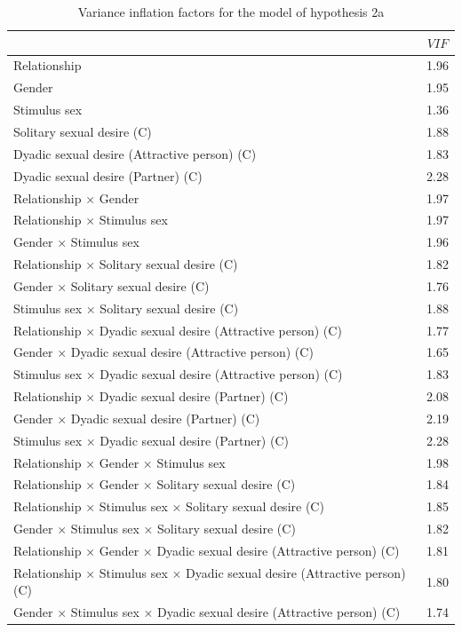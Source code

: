 \documentclass[
  bookmarksnumbered]{article}
\begin{document}
\begin{table}[H]

\caption{\label{tab:coli-m2b}Variance inflation factors for the model of hypothesis 2a}
\centering
\begin{tabular}[t]{lc}
\toprule
  & $VIF$\\
\midrule
Relationship & 1.96\\
Gender & 1.95\\
Stimulus sex & 1.36\\
Solitary sexual desire (C) & 1.88\\
Dyadic sexual desire (Attractive person) (C) & 1.83\\
Dyadic sexual desire (Partner) (C) & 2.28\\
Relationship × Gender & 1.97\\
Relationship × Stimulus sex & 1.97\\
Gender × Stimulus sex & 1.96\\
Relationship × Solitary sexual desire (C) & 1.82\\
Gender × Solitary sexual desire (C) & 1.76\\
Stimulus sex × Solitary sexual desire (C) & 1.88\\
Relationship × Dyadic sexual desire (Attractive person) (C) & 1.77\\
Gender × Dyadic sexual desire (Attractive person) (C) & 1.65\\
Stimulus sex × Dyadic sexual desire (Attractive person) (C) & 1.83\\
Relationship × Dyadic sexual desire (Partner) (C) & 2.08\\
Gender × Dyadic sexual desire (Partner) (C) & 2.19\\
Stimulus sex × Dyadic sexual desire (Partner) (C) & 2.28\\
Relationship × Gender × Stimulus sex & 1.98\\
Relationship × Gender × Solitary sexual desire (C) & 1.84\\
Relationship × Stimulus sex × Solitary sexual desire (C) & 1.85\\
Gender × Stimulus sex × Solitary sexual desire (C) & 1.82\\
Relationship × Gender × Dyadic sexual desire (Attractive person) (C) & 1.81\\
Relationship × Stimulus sex × Dyadic sexual desire (Attractive person) (C) & 1.80\\
Gender × Stimulus sex × Dyadic sexual desire (Attractive person) (C) & 1.74\\

\end{tabular}
\end{table}
\end{document}
